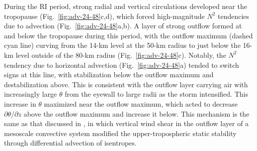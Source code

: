 During the RI period, strong radial and vertical circulations developed near the tropopause (Fig.~\ref{fig:adv-24-48}c,d), which forced high-magnitude $N^2$ tendencies due to advection (Fig.~\ref{fig:adv-24-48}a,b).
A layer of strong outflow formed at and below the tropopause during this period, with the outflow maximum (dashed cyan line) curving from the 14-km level at the 50-km radius to just below the 16-km level outside of the 80-km radius (Fig.~\ref{fig:adv-24-48}c).
Notably, the $N^2$ tendency due to horizontal advection (Fig.~\ref{fig:adv-24-48}a) tended to switch signs at this line, with stabilization below the outflow maximum and destabilization above.
This is consistent with the outflow layer carrying air with increasingly large $\theta$ from the eyewall to large radii as the storm intensified.
This increase in $\theta$ maximized near the outflow maximum, which acted to decrease $\partial \theta/\partial z$ above the outflow maximum and increase it below.
This mechanism is the same as that discussed in \cite{TrierSharman}, in which vertical wind shear in the outflow layer of a mesoscale convective system modified the upper-tropospheric static stability through differential advection of isentropes.

